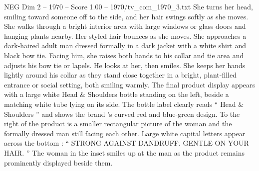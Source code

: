 \begin{textsample}{NEG Dim 2 – 1970 – Score 1.00 – 1970/tv\_com\_1970\_3.txt}
She turns her head, smiling toward someone off to the side, and her hair swings softly as she moves.
She walks through a bright interior area with large windows or glass doors and hanging plants nearby.
Her styled hair bounces as she moves.
She approaches a dark-haired adult man dressed formally in a dark jacket with a white shirt and black bow tie.
Facing him, she raises both hands to his collar and tie area and adjusts his bow tie or lapels.
He looks at her, then smiles.
She keeps her hands lightly around his collar as they stand close together in a bright, plant-filled entrance or social setting, both smiling warmly.
The final product display appears with a large white Head \& Shoulders bottle standing on the left, beside a matching white tube lying on its side.
The bottle label clearly reads “ Head \& Shoulders ” and shows the brand ’s curved red and blue-green design.
To the right of the product is a smaller rectangular picture of the woman and the formally dressed man still facing each other.
Large white capital letters appear across the bottom : “ STRONG AGAINST DANDRUFF.
GENTLE ON YOUR HAIR. ” The woman in the inset smiles up at the man as the product remains prominently displayed beside them.

\end{textsample}
